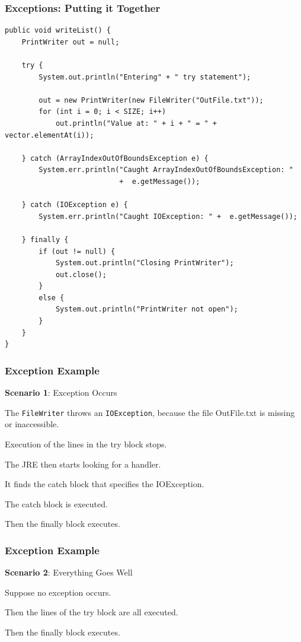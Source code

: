 \begin{frame}[fragile]
\frametitle{Exceptions: Putting it Together}
\begin{changemargin}{1cm}
{\scriptsize
\begin{verbatim}
public void writeList() {
    PrintWriter out = null;

    try {
        System.out.println("Entering" + " try statement");

        out = new PrintWriter(new FileWriter("OutFile.txt"));
        for (int i = 0; i < SIZE; i++)
            out.println("Value at: " + i + " = " + vector.elementAt(i));
                  
    } catch (ArrayIndexOutOfBoundsException e) {
        System.err.println("Caught ArrayIndexOutOfBoundsException: "
                           +  e.getMessage());
                                 
    } catch (IOException e) {
        System.err.println("Caught IOException: " +  e.getMessage());
                                 
    } finally {
        if (out != null) {
            System.out.println("Closing PrintWriter");
            out.close();
        } 
        else {
            System.out.println("PrintWriter not open");
        }
    }
}
\end{verbatim}
}

\end{changemargin}
\end{frame}

\begin{frame}
\frametitle{Exception Example}
\begin{changemargin}{1cm}

\textbf{Scenario 1}: Exception Occurs

The \texttt{FileWriter} throws an \texttt{IOException}, because the file OutFile.txt is missing or inaccessible. 

Execution of the lines in the try block stops. 

The JRE then starts looking for a handler. 

It finds the catch block that specifies the IOException. 

The catch block is executed. 

Then the finally block executes.

\end{changemargin}
\end{frame}


\begin{frame}
\frametitle{Exception Example}
\begin{changemargin}{1cm}

\textbf{Scenario 2}: Everything Goes Well 

Suppose no exception occurs. 

Then the lines of the try block are all executed.

Then the finally block executes.

\end{changemargin}
\end{frame}

